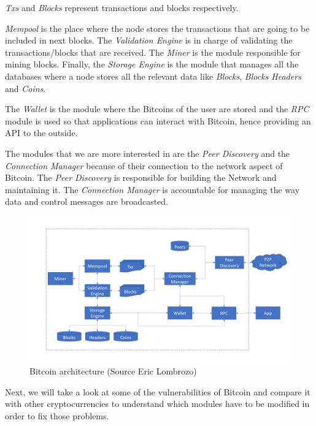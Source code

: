 \textit{Txs} and \textit{Blocks} represent transactions and blocks respectively.

\textit{Mempool} is the place where the node stores the transactions that are going to be included in next blocks. The \textit{Validation Engine} is in charge of validating the transactions/blocks that are received. The \textit{Miner} is the module responsible for mining blocks. Finally, the \textit{Storage Engine} is the module that manages all the databases where a node stores all the relevant data like \textit{Blocks}, \textit{Blocks Headers} and \textit{Coins}.

The \textit{Wallet} is the module where the Bitcoins of the user are stored and the \textit{RPC} module is used so that applications can interact with Bitcoin, hence providing an API to the outside.

The modules that we are more interested in are the \textit{Peer Discovery} and the \textit{Connection Manager} because of their connection to the network aspect of Bitcoin. The \textit{Peer Discovery} is responsible for building the Network and maintaining it. The \textit{Connection Manager} is accountable for managing the way data and control messages are broadcasted.

\begin{figure}[h]
\centering
\includegraphics[scale=0.4]{figs/My-Bitcoin-Core-architecture}
\caption{Bitcoin architecture (Source Eric Lombrozo)}
\label{fig:bitcoinoverview}
\end{figure}

Next, we will take a look at some of the vulnerabilities of Bitcoin and compare it with other cryptocurrencies to understand which modules have to be modified in order to fix those problems.



